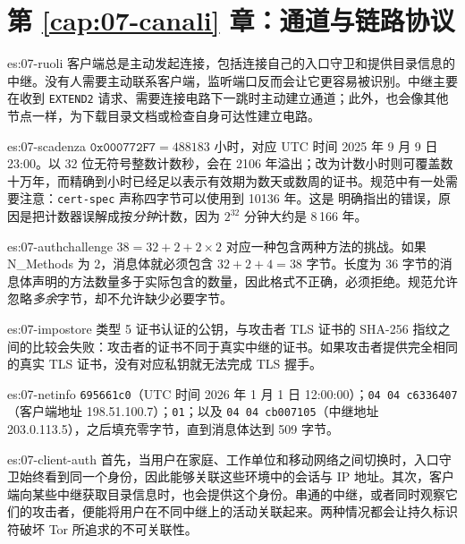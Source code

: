 \section*{第 \ref{cap:07-canali} 章：通道与链路协议}

\begin{soluzione}{es:07-ruoli}
客户端总是主动发起连接，包括连接自己的入口守卫和提供目录信息的中继。没有人需要主动联系客户端，监听端口反而会让它更容易被识别。中继主要在收到 \texttt{EXTEND2} 请求、需要连接电路下一跳时主动建立通道；此外，也会像其他节点一样，为下载目录文档或检查自身可达性建立电路。
\end{soluzione}

\begin{soluzione}{es:07-scadenza}
$\texttt{0x000772F7} = 488183$ 小时，对应 UTC 时间 2025 年 9 月 9 日 23:00。以 32 位无符号整数计数秒，会在 2106 年溢出；改为计数小时则可覆盖数十万年，而精确到小时已经足以表示有效期为数天或数周的证书。规范中有一处需要注意：\texttt{cert-spec} 声称四字节可以使用到 10136 年。这是  明确指出的错误，原因是把计数器误解成按\emph{分钟}计数，因为 $2^{32}$ 分钟大约是 8\,166 年。
\end{soluzione}

\begin{soluzione}{es:07-authchallenge}
$38 = 32 + 2 + 2 \times 2$ 对应一种包含两种方法的挑战。如果 N\_Methods 为 2，消息体就必须包含 $32+2+4=38$ 字节。长度为 36 字节的消息体声明的方法数量多于实际包含的数量，因此格式不正确，必须拒绝。规范允许忽略\emph{多余}字节，却不允许缺少必要字节。
\end{soluzione}

\begin{soluzione}{es:07-impostore}
类型 5 证书认证的公钥，与攻击者 TLS 证书的 SHA-256 指纹之间的比较会失败：攻击者的证书不同于真实中继的证书。如果攻击者提供完全相同的真实 TLS 证书，没有对应私钥就无法完成 TLS 握手。
\end{soluzione}

\begin{soluzione}{es:07-netinfo}
\texttt{695661c0}（UTC 时间 2026 年 1 月 1 日 12:00:00）；\texttt{04 04 c6336407}（客户端地址 198.51.100.7）；\texttt{01}；以及 \texttt{04 04 cb007105}（中继地址 203.0.113.5），之后填充零字节，直到消息体达到 509 字节。
\end{soluzione}

\begin{soluzione}{es:07-client-auth}
首先，当用户在家庭、工作单位和移动网络之间切换时，入口守卫始终看到同一个身份，因此能够关联这些环境中的会话与 IP 地址。其次，客户端向某些中继获取目录信息时，也会提供这个身份。串通的中继，或者同时观察它们的攻击者，便能将用户在不同中继上的活动关联起来。两种情况都会让持久标识符破坏 Tor 所追求的不可关联性。
\end{soluzione}

